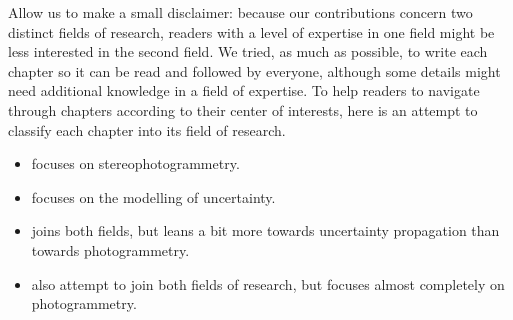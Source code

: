 Allow us to make a small disclaimer: because our contributions concern two distinct fields of research, readers with a level of expertise in one field might be less interested in the second field. We tried, as much as possible, to write each chapter so it can be read and followed by everyone, although some details might need additional knowledge in a field of expertise. To help readers to navigate through chapters according to their center of interests, here is an attempt to classify each chapter into its field of research.
\begin{itemize}
    \item {} focuses on stereophotogrammetry.
    \item {} focuses on the modelling of uncertainty.
    \item {} joins both fields, but leans a bit more towards uncertainty propagation than towards photogrammetry. 
    \item {} also attempt to join both fields of research, but focuses almost completely on photogrammetry.
\end{itemize}

